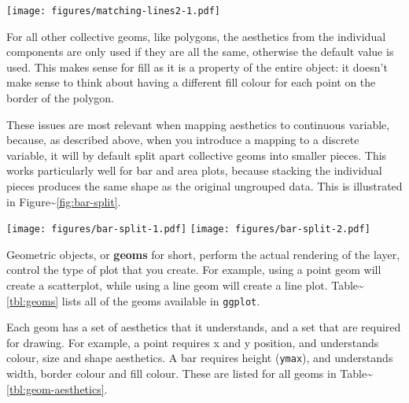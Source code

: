 \texttt{[image: figures/matching-lines2-1.pdf]}

For all other collective geoms, like polygons, the aesthetics from the
individual components are only used if they are all the same, otherwise
the default value is used. This makes sense for fill as it is a property
of the entire object: it doesn't make sense to think about having a
different fill colour for each point on the border of the polygon.

These issues are most relevant when mapping aesthetics to continuous
variable, because, as described above, when you introduce a mapping to a
discrete variable, it will by default split apart collective geoms into
smaller pieces. This works particularly well for bar and area plots,
because stacking the individual pieces produces the same shape as the
original ungrouped data. This is illustrated in
Figure\textasciitilde{}\ref{fig:bar-split}.

\begin{Shaded}
\begin{Highlighting}[]
 
  
\end{Highlighting}
\end{Shaded}

\texttt{[image: figures/bar-split-1.pdf]}
\texttt{[image: figures/bar-split-2.pdf]}


Geometric objects, or \textbf{geoms} for short, perform the actual
rendering of the layer, control the type of plot that you create. For
example, using a point geom will create a scatterplot, while using a
line geom will create a line plot. Table\textasciitilde{}\ref{tbl:geoms}
lists all of the geoms available in \texttt{ggplot}.

Each geom has a set of aesthetics that it understands, and a set that
are required for drawing. For example, a point requires x and y
position, and understands colour, size and shape aesthetics. A bar
requires height (\texttt{ymax}), and understands width, border colour
and fill colour. These are listed for all geoms in
Table\textasciitilde{}\ref{tbl:geom-aesthetics}. 

